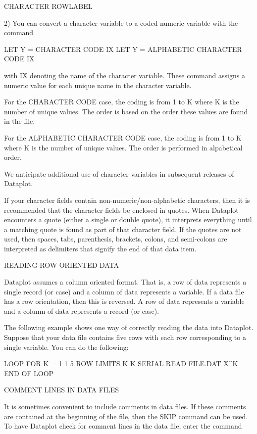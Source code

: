         CHARACTER ROWLABEL

   2) You can convert a character variable to a coded numeric
      variable with the command

        LET Y = CHARACTER CODE IX
        LET Y = ALPHABETIC CHARACTER CODE IX

      with IX denoting the name of the character variable.  These
      command assigns a numeric value for each unique name in
      the character variable.

      For the CHARACTER CODE case, the coding is from 1 to K where
      K is the number of unique values.  The order is based on
      the order these values are found in the file.

      For the ALPHABETIC CHARACTER CODE case, the coding is from
      1 to K where K is the number of unique values.  The order is
      performed in alpabetical order.

We anticipate additional use of character variables in subsequent
releases of Dataplot.

If your character fields contain non-numeric/non-alphabetic characters,
then it is recommended that the character fields be enclosed in
quotes.  When Dataplot encounters a quote (either a single or double
quote), it interprets everything until a matching quote is found
as part of that character field.  If the quotes are not used,
then spaces, tabs, parenthesis, brackets, colons, and semi-colons
are interpreted as delimiters that signify the end of that data item.


READING ROW ORIENTED DATA

Dataplot assumes a column oriented format.  That is, a row of
data represents a single record (or case) and a column of data 
represents a variable.  If a data file has a row orientation, then
this is reversed.  A row of data represents a variable and a column
of data represents a record (or case).

The following example shows one way of correctly reading the data
into Dataplot.  Suppose that your data file contains five rows with
each row corresponding to a single variable.  You can do the following:

   LOOP FOR K = 1 1 5
      ROW LIMITS K K
      SERIAL READ FILE.DAT  X^K
   END OF LOOP


COMMENT LINES IN DATA FILES

It is sometimes convenient to include comments in data files.
If these comments are contained at the beginning of the file, then
the SKIP command can be used.  To have Dataplot check for comment
lines in the data file, enter the command

